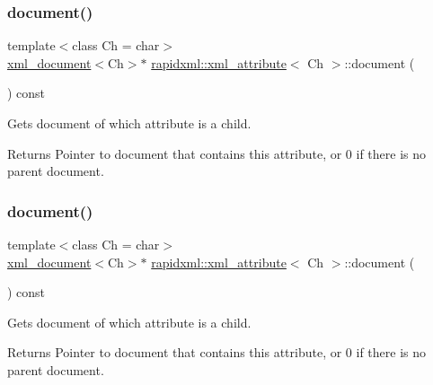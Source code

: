 \subsubsection{\texorpdfstring{document()}{document()}\hspace{0.1cm}{\footnotesize\ttfamily [1/2]}}
{\footnotesize\ttfamily template$<$class Ch = char$>$ \\
\mbox{\hyperlink{classrapidxml_1_1xml__document}{xml\+\_\+document}}$<$Ch$>$$\ast$ \mbox{\hyperlink{classrapidxml_1_1xml__attribute}{rapidxml\+::xml\+\_\+attribute}}$<$ Ch $>$\+::document (\begin{DoxyParamCaption}{ }\end{DoxyParamCaption}) const\hspace{0.3cm}{\ttfamily [inline]}}

Gets document of which attribute is a child. \begin{DoxyReturn}{Returns}
Pointer to document that contains this attribute, or 0 if there is no parent document. 
\end{DoxyReturn}
\mbox{\label{classrapidxml_1_1xml__attribute_ab0ff3bc7880a6969ddcf0bb1e0444077}} 
\subsubsection{\texorpdfstring{document()}{document()}\hspace{0.1cm}{\footnotesize\ttfamily [2/2]}}
{\footnotesize\ttfamily template$<$class Ch = char$>$ \\
\mbox{\hyperlink{classrapidxml_1_1xml__document}{xml\+\_\+document}}$<$Ch$>$$\ast$ \mbox{\hyperlink{classrapidxml_1_1xml__attribute}{rapidxml\+::xml\+\_\+attribute}}$<$ Ch $>$\+::document (\begin{DoxyParamCaption}{ }\end{DoxyParamCaption}) const\hspace{0.3cm}{\ttfamily [inline]}}

Gets document of which attribute is a child. \begin{DoxyReturn}{Returns}
Pointer to document that contains this attribute, or 0 if there is no parent document. 
\end{DoxyReturn}
\mbox{\label{classrapidxml_1_1xml__attribute_affd0c8d0a9020df0998c507cae5474e5}} 

